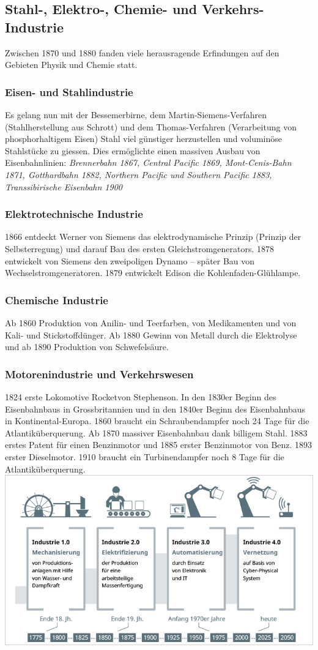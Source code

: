 \documentclass[10pt, openright=true]{scrartcl}
\begin{document}
\subsection{Stahl-, Elektro-, Chemie- und Verkehrs-Industrie}
Zwischen 1870 und 1880 fanden viele herausragende Erfindungen auf den Gebieten Physik und Chemie statt.
\subsubsection{Eisen- und Stahlindustrie}
Es gelang nun mit der Bessemerbirne, dem Martin-Siemens-Verfahren (Stahlherstellung aus Schrott) und dem Thomas-Verfahren (Verarbeitung von phosphorhaltigem Eisen) Stahl viel günstiger herzustellen und voluminöse Stahlstücke zu giessen. Dies ermöglichte einen massiven Ausbau von Eisenbahnlinien: \textit{Brennerbahn 1867, Central Pacific 1869, Mont-Cenis-Bahn 1871, Gotthardbahn 1882, Northern Pacific und Southern Pacific 1883, Transsibirische Eisenbahn 1900}
\subsubsection{Elektrotechnische Industrie}
1866 entdeckt Werner von Siemens das elektrodynamische Prinzip (Prinzip der Selbsterregung) und darauf Bau des ersten Gleichstromgenerators. 1878 entwickelt von Siemens den zweipoligen Dynamo – später Bau von Wechselstromgeneratoren. 1879 entwickelt Edison die Kohlenfaden-Glühlampe.
\subsubsection{Chemische Industrie}
Ab 1860 Produktion von Anilin- und Teerfarben, von Medikamenten und von Kali- und Stickstoffdünger. Ab 1880 Gewinn von Metall durch die Elektrolyse und ab 1890 Produktion von Schwefelsäure.
\subsubsection{Motorenindustrie und Verkehrswesen}
1824 erste Lokomotive \glqq Rocket\grqq von Stephenson. In den 1830er Beginn des Eisenbahnbaus in Grossbritannien und in den 1840er Beginn des Eisenbahnbaus in Kontinental-Europa. 1860 braucht ein Schraubendampfer noch 24 Tage für die Atlantiküberquerung. Ab 1870 massiver Eisenbahnbau dank billigem Stahl. 1883 erstes Patent für einen Benzinmotor und 1885 erster Benzinmotor von Benz. 1893 erster Dieselmotor. 1910 braucht ein Turbinendampfer noch 8 Tage für die Atlantiküberquerung.\\
\includegraphics[width=.65\textwidth]{images/Industrieentwicklung}
\end{document}
